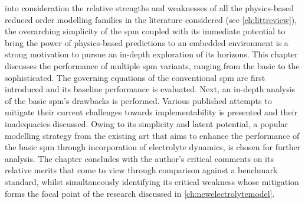 

 into consideration the  relative strengths and weaknesses
of  all the  physics-based reduced  order modelling  families in  the literature
considered  (see  \cref{ch:littreview}),  the   overarching  simplicity  of  the
\gls{spm}  coupled  with   its  immediate  potential  to  bring   the  power  of
physics-based predictions to  an embedded environment is a  strong motivation to
pursue  an in-depth  exploration of  its  horizons. This  chapter discusses  the
performance  of multiple  \gls{spm}  variants,  ranging from  the  basic to  the
sophisticated. The governing  equations of the conventional  \gls{spm} are first
introduced and its baseline performance is evaluated. Next, an in-depth analysis
of the basic  \gls{spm}'s drawbacks is performed. Various  published attempts to
mitigate  their current  challenges  towards implementability  is presented  and
their  inadequacies discussed.  Owing to  its simplicity  and latent  potential,
a  popular  modelling strategy  from  the  existing  art  that aims  to  enhance
the  performance of  the basic  \gls{spm} through  incorporation of  electrolyte
dynamics,  is  chosen for  further  analysis.  The  chapter concludes  with  the
author's critical  comments on  its relative  merits that  come to  view through
comparison against  a benchmark standard, whilst  simultaneously identifying its
critical  weakness  whose mitigation  forms  the  focal  point of  the  research
discussed in \cref{ch:newelectrolytemodel}.

